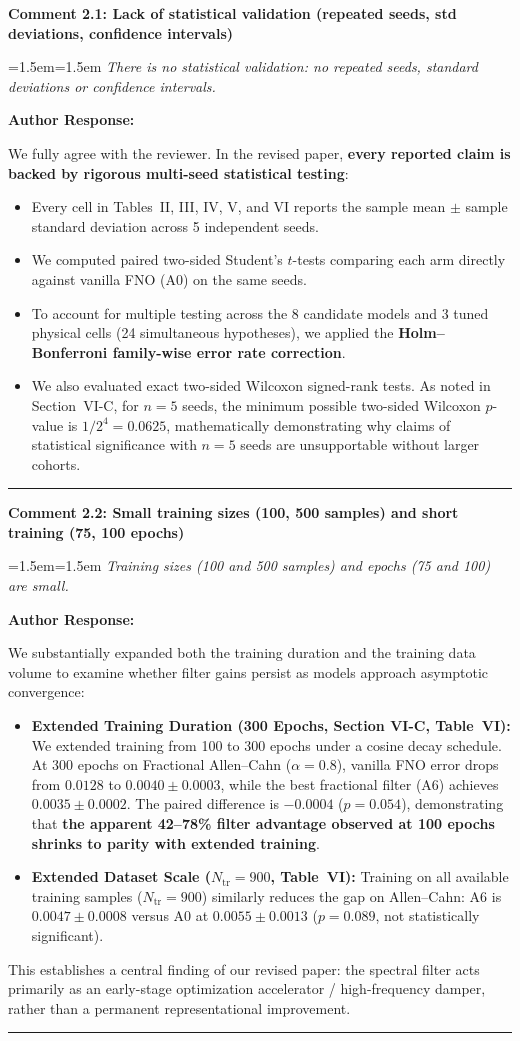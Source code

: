 \documentclass[11pt,a4paper]{article}
\newcommand{\revcomment}[2]{%
  \vspace{3mm}\par\noindent
  \textbf{\color{navyblue}#1}\par\vspace{1.5mm}
  \begingroup
  \leftskip=1.5em\rightskip=1.5em
  \small\itshape\color{commentgray}
  #2\par
  \endgroup
  \vspace{2mm}
}
\newenvironment{authorresponse}{%
  \vspace{1mm}\par\noindent
  \textbf{\color{navyblue}Author Response:}\par\vspace{1.5mm}
}{%
  \vspace{3mm}\par\noindent\rule{\textwidth}{0.3pt}\vspace{2mm}
}
\begin{document}
\revcomment{Comment 2.1: Lack of statistical validation (repeated seeds, std deviations, confidence intervals)}{There is no statistical validation: no repeated seeds, standard deviations or confidence intervals.}

\begin{authorresponse}
We fully agree with the reviewer. In the revised paper, \textbf{every reported claim is backed by rigorous multi-seed statistical testing}:
\begin{itemize}
  \item Every cell in Tables~II, III, IV, V, and VI reports the sample mean $\pm$ sample standard deviation across 5 independent seeds.
  \item We computed paired two-sided Student's $t$-tests comparing each arm directly against vanilla FNO (A0) on the same seeds.
  \item To account for multiple testing across the 8 candidate models and 3 tuned physical cells (24 simultaneous hypotheses), we applied the \textbf{Holm--Bonferroni family-wise error rate correction}.
  \item We also evaluated exact two-sided Wilcoxon signed-rank tests. As noted in Section~VI-C, for $n=5$ seeds, the minimum possible two-sided Wilcoxon $p$-value is $1/2^4 = 0.0625$, mathematically demonstrating why claims of statistical significance with $n=5$ seeds are unsupportable without larger cohorts.
\end{itemize}
\end{authorresponse}

\revcomment{Comment 2.2: Small training sizes (100, 500 samples) and short training (75, 100 epochs)}{Training sizes (100 and 500 samples) and epochs (75 and 100) are small.}

\begin{authorresponse}
We substantially expanded both the training duration and the training data volume to examine whether filter gains persist as models approach asymptotic convergence:
\begin{itemize}
  \item \textbf{Extended Training Duration (300 Epochs, Section VI-C, Table~VI):} We extended training from 100 to 300 epochs under a cosine decay schedule. At 300 epochs on Fractional Allen--Cahn ($\alpha=0.8$), vanilla FNO error drops from $0.0128$ to $\mathbf{0.0040 \pm 0.0003}$, while the best fractional filter (A6) achieves $0.0035 \pm 0.0002$. The paired difference is $-0.0004$ ($p = 0.054$), demonstrating that \textbf{the apparent 42--78\% filter advantage observed at 100 epochs shrinks to parity with extended training}.
  \item \textbf{Extended Dataset Scale ($N_{\mathrm{tr}} = 900$, Table~VI):} Training on all available training samples ($N_{\mathrm{tr}} = 900$) similarly reduces the gap on Allen--Cahn: A6 is $0.0047 \pm 0.0008$ versus A0 at $0.0055 \pm 0.0013$ ($p = 0.089$, not statistically significant).
\end{itemize}
This establishes a central finding of our revised paper: the spectral filter acts primarily as an early-stage optimization accelerator / high-frequency damper, rather than a permanent representational improvement.
\end{authorresponse}
\end{document}

